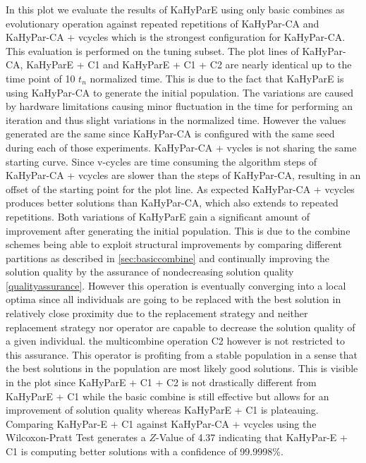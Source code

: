 \documentclass[a4paper,12pt,titlepage, BCOR7mm,headsepline]{scrbook}
\numberwithin{equation}{section}
\begin{document}
In this plot we evaluate the results of KaHyParE using only basic combines as evolutionary operation against repeated repetitions of KaHyPar-CA and KaHyPar-CA + vcycles which is the strongest configuration for KaHyPar-CA. This evaluation is performed on the tuning subset. The plot lines of KaHyPar-CA, KaHyParE + C1 and KaHyParE + C1 + C2 are nearly identical up to the time point of 10 $t_n$ normalized time. This is due to the fact that KaHyParE is using KaHyPar-CA to generate the initial population. The variations are caused by hardware limitations causing minor fluctuation in the time for performing an iteration and thus slight variations in the normalized time. However the values generated are the same since KaHyPar-CA is configured with the same seed during each of those experiments. KaHyPar-CA + vycles is not sharing the same starting curve. Since v-cycles are time consuming the algorithm steps of KaHyPar-CA + vcycles are slower than the steps of KaHyPar-CA, resulting in an offset of the starting point for the plot line. As expected KaHyPar-CA + vcycles produces better solutions than KaHyPar-CA, which also extends to repeated repetitions. Both variations of KaHyParE gain a significant amount of improvement after generating the initial population. This is due to the combine schemes being able to exploit structural improvements by comparing different partitions as described in \ref{sec:basiccombine} and continually improving the solution quality by the assurance of nondecreasing solution quality \ref{qualityassurance}. However this operation is eventually converging into a local optima since all individuals are going to be replaced with the best solution in relatively close proximity due to the replacement strategy and neither replacement strategy nor operator are capable to decrease the solution quality of a given individual. the multicombine operation C2 however is not restricted to this assurance. This operator is profiting from a stable population in a sense that the best solutions in the population are most likely good solutions. This is visible in the plot since KaHyParE + C1 + C2 is not drastically different from KaHyParE + C1 while the basic combine is still effective but allows for an improvement of solution quality whereas KaHyParE + C1 is plateauing. Comparing KaHyPar-E + C1 against KaHyPar-CA + vcycles using the Wilcoxon-Pratt Test generates a $Z$-Value of 4.37 indicating that KaHyPar-E + C1 is computing better solutions with a confidence of 99.9998\%.
\end{document}

